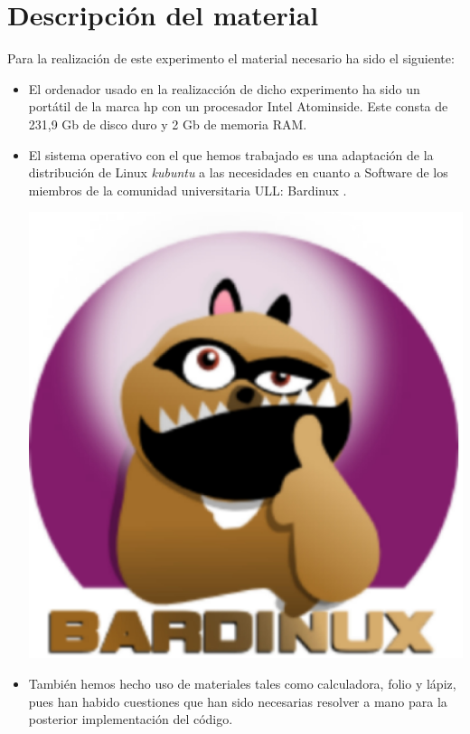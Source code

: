 \section{Descripción del material}
\label{3:sec:2}
    Para la realización de este experimento el material necesario ha sido el siguiente:
 \begin{itemize}
  \item El ordenador usado en la realizacción de dicho experimento ha sido un portátil de la marca hp con un procesador Intel Atom{\tiny inside}. Este consta de 231,9 Gb de disco duro y 2 Gb de memoria RAM.
  \item El sistema operativo con el que hemos trabajado es una adaptación de la distribución de Linux \textit{kubuntu} a las necesidades en cuanto a Software de los miembros de la comunidad universitaria ULL: Bardinux \cite{url:bardinux}. 
   \begin{center}
   \includegraphics[scale=0.15]{images/bardinux.eps}
   \end{center}
  \item También hemos hecho uso de materiales tales como calculadora, folio y lápiz, pues han habido cuestiones que han sido necesarias resolver a mano para la posterior implementación del código.
 \end{itemize}
